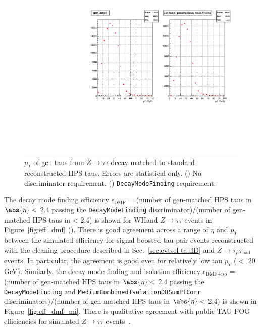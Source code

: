 \begin{figure}[hbtp]
  \begin{center}
    \includegraphics[width=\cmsFigWidth]{figures/gentau_pt_ztt_dmf}
    \caption{$p_T$ of gen taus from $Z\rightarrow\tau\tau$ decay matched to standard reconstructed HPS taus.  Errors are statistical only.  (\cmsLeft) No discriminator requirement.  (\cmsRight) \texttt{DecayModeFinding} requirement.}
    \label{fig:gen_ztt}
  \end{center}
\end{figure}

The decay mode finding efficiency $\epsilon_{\text{DMF}}$ = (number of gen-matched HPS taus in $\abs{\eta} <$ 2.4 passing the \texttt{DecayModeFinding} discriminator)/(number of gen-matched HPS taus in \abs{\eta} \textless\xspace 2.4) is shown for WHand $Z\rightarrow\tau\tau$ events in Figure~\ref{fig:eff_dmf} (\cmsLeft).  There is good agreement across a range of $\eta$ and $p_T$ between the simulated efficiency for signal boosted tau pair events reconstructed with the cleaning procedure described in Sec.~\ref{sec:evtsel-tauID} and $Z\rightarrow\tau_{\mu}\tau_{\text{had}}$ events.  In particular, the agreement is good even for relatively low tau $p_T$ ($<$ 20 GeV).  Similarly, the decay mode finding and isolation efficiency $\epsilon_{\text{DMF+iso}}$ = (number of gen-matched HPS taus in $\abs{\eta} <$ 2.4 passing the \texttt{DecayModeFinding} and \texttt{MediumCombinedIsolationDBSumPtCorr} discriminators)/(number of gen-matched HPS taus in $\abs{\eta} <$ 2.4) is shown in Figure~\ref{fig:eff_dmf_mi}. There is qualitative agreement with public TAU POG efficiencies for simulated $Z\rightarrow\tau\tau$ events~\cite{CMS:approvedTAUResults}.

